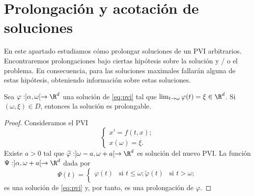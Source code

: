 \documentclass{article}
\begin{document}
\section{Prolongación y acotación de soluciones}

En este apartado estudiamos cómo prolongar soluciones de un PVI arbitrarios. Encontraremos
prolongaciones bajo ciertas hipótesis sobre la solución y / o el problema. En consecuencia, para las
soluciones maximales fallarán alguna de estas hipótesis, obteniendo información sobre estas
soluciones.

\begin{lemma}
  Sea $\varphi : ]\alpha, \omega[ \to \R^d$ una solución de \eqref{eq:pvi} tal que
  $\lim_{t \to \omega} \varphi(t) = \xi \in \R^d$. Si $(\omega, \xi) \in D$, entonces la solución es
  prolongable.
\end{lemma}
\begin{proof}
  Consideramos el PVI
  \[\begin{cases}x' = f(t, x); \\ x(\omega) = \xi. \end{cases}\]
  Existe $a > 0$ tal que $\widetilde{\varphi}: ]\omega-a, \omega+a[ \to \R^d$ es solución del nuevo
  PVI. La función $\Psi: ]\alpha, \omega+a[ \to \R^d$ dada por
  \[\Psi(t) = \begin{cases} \varphi(t) & \text{si } t \le \omega; \widetilde{\varphi}(t) & \text{si
      } t > \omega;\\\end{cases}\] es una solución de \eqref{eq:pvi} y, por tanto, es una
  prolongación de $\varphi$.
\end{proof}
\end{document}
